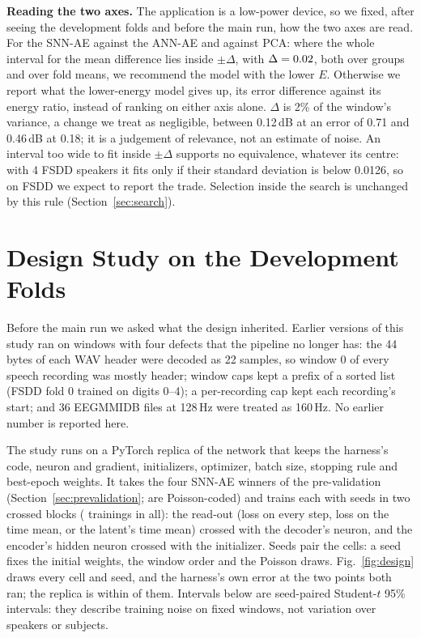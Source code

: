 \documentclass[conference]{IEEEtran}
\begin{document}
\par \textbf{Reading the two axes.} The application is a low-power device, so we fixed, after
seeing the development folds and before the main run, how the two axes are read. For the SNN-AE
against the ANN-AE and against PCA: where the whole interval for the mean difference lies inside
$\pm\Delta$, with $\Delta=0.02$, both over groups and over fold means, we recommend the
model with the lower $E$. Otherwise we report what the lower-energy model gives up, its error
difference against its energy ratio, instead of ranking on either axis alone. $\Delta$ is 2\% of the window's
variance, a change we treat as negligible, between 0.12\,dB at an error of 0.71 and 0.46\,dB at
0.18; it is a judgement of relevance, not an estimate of noise. An interval too wide to fit inside
$\pm\Delta$ supports no equivalence, whatever its centre: with 4 FSDD speakers it fits only if
their standard deviation is below 0.0126, so on FSDD we expect to report the trade. Selection inside the search is unchanged by this rule
(Section~\ref{sec:search}).

\section{Design Study on the Development Folds}
\label{sec:design}

\par Before the main run we asked what the design inherited. Earlier versions of this study ran
on windows with four defects that the pipeline no longer has: the 44 bytes of each WAV header were
decoded as 22 samples, so window 0 of every speech recording was mostly header; window caps kept a
prefix of a sorted list (FSDD fold 0 trained on digits 0--4); a per-recording cap kept each
recording's start; and 36 EEGMMIDB files at 128\,Hz were treated as 160\,Hz. No earlier number is
reported here.

\par The study runs on a PyTorch replica of the network that keeps the harness's code, neuron
and gradient, initializers, optimizer, batch size, stopping rule and best-epoch weights. It takes
the four SNN-AE winners of the pre-validation (Section~\ref{sec:prevalidation};
\designPoissonWinners{} are Poisson-coded) and trains each with \designSeeds{} seeds in two
crossed blocks (\designTrainings{} trainings in all): the read-out (loss on every step, loss on
the time mean, or the latent's time mean) crossed with the decoder's neuron, and the encoder's
hidden neuron crossed with the initializer. Seeds pair the cells: a seed fixes the initial
weights, the window order and the Poisson draws. Fig.~\ref{fig:design} draws every cell and seed,
and the harness's own error at the two points both ran; the replica is within
\designTwinWithin{} of them. Intervals below are seed-paired Student-$t$ 95\% intervals: they
describe training noise on fixed windows, not variation over speakers or subjects.
\end{document}
